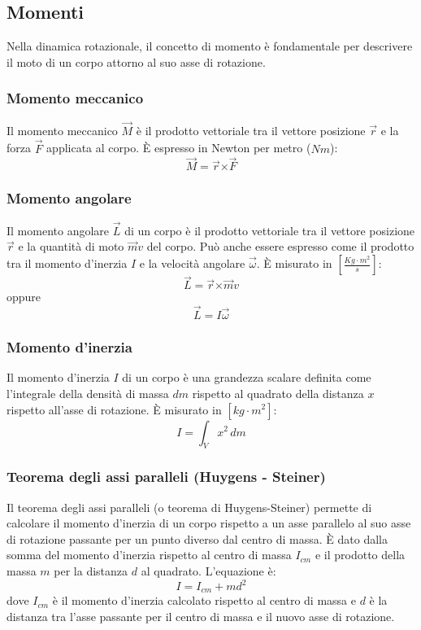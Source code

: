 \documentclass{article}
\begin{document}
\subsection{Momenti}
Nella dinamica rotazionale, il concetto di momento è fondamentale per descrivere il moto di un corpo attorno al suo asse di rotazione.
\subsubsection{Momento meccanico}
Il momento meccanico \( \Vec{M} \) è il prodotto vettoriale tra il vettore posizione \( \Vec{r} \) e la forza \( \Vec{F} \) applicata al corpo. È espresso in Newton per metro (\( Nm \)):
\[
    \Vec{M} = \Vec{r} \text{×}\Vec{F} 
\]
\subsubsection{Momento angolare}
Il momento angolare \( \Vec{L} \) di un corpo è il prodotto vettoriale tra il vettore posizione \( \Vec{r} \) e la quantità di moto \( \Vec{m}v \) del corpo. Può anche essere espresso come il prodotto tra il momento d'inerzia \( I \) e la velocità angolare \( \Vec{\omega} \). È misurato in \([ \frac{Kg \cdot m^2}{s} ]\):
\[
    \Vec{L} = \Vec{r} \text{×} \Vec{m}v 
\]
oppure
\[
    \Vec{L} = I\Vec{\omega}
\]
\subsubsection{Momento d'inerzia}
Il momento d'inerzia \( I \) di un corpo è una grandezza scalare definita come l'integrale della densità di massa \( dm \) rispetto al quadrato della distanza \( x \) rispetto all'asse di rotazione. È misurato in \( [ kg \cdot m^2 ] \):
\[
    I = \int_{V} x^2 \, dm
\]
\subsubsection{Teorema degli assi paralleli (Huygens - Steiner)}
Il teorema degli assi paralleli (o teorema di Huygens-Steiner) permette di calcolare il momento d'inerzia di un corpo rispetto a un asse parallelo al suo asse di rotazione passante per un punto diverso dal centro di massa. È dato dalla somma del momento d'inerzia rispetto al centro di massa \( I_{cm} \) e il prodotto della massa \( m \) per la distanza \( d \) al quadrato. L'equazione è:
\[ I = I_{cm} + md^2 \]
dove \( I_{cm} \) è il momento d'inerzia calcolato rispetto al centro di massa e \( d \) è la distanza tra l'asse passante per il centro di massa e il nuovo asse di rotazione.
\end{document}
